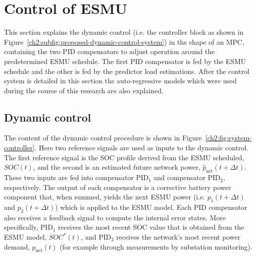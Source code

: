 \section{Control of ESMU}
\label{ch2:sec:control-of-esmu}



This section explains the dynamic control (i.e. the controller block as shown in Figure~\ref{ch2:subfig:proposed-dynamic-control-system}) in the shape of an MPC, containing the two PID compensators to adjust operation around the predetermined ESMU schedule.
The first PID compensator is fed by the ESMU schedule and the other is fed by the predictor load estimations.
After the control system is detailed in this section the auto-regressive models which were used during the course of this research are also explained.

\subsection{Dynamic control}

The content of the dynamic control procedure is shown in Figure~\ref{ch2:fig:system-controller}.
Here two reference signals are used as inputs to the dynamic control.
The first reference signal is the SOC profile derived from the ESMU scheduled, $SOC(t)$, and the second is an estimated future network power, $\hat{p}_\text{net}(t+\Delta t)$.
These two inputs are fed into compensator PID$_1$ and compensator PID$_2$, respectively.
The output of each compensator is a corrective battery power component that, when summed, yields the next ESMU power (i.e. $p_1(t+\Delta t)$ and $p_2(t+\Delta t)$) which is applied to the ESMU model.
Each PID compensator also receives a feedback signal to compute the internal error states.
More specifically, PID$_1$ receives the most recent SOC value that is obtained from the ESMU model, $SOC^*(t)$, and PID$_2$ receives the network's most recent power demand, $p_\text{net}(t)$ (for example through measurements by substation monitoring).


